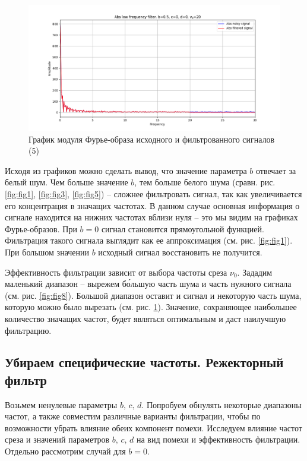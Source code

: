 \documentclass[a4paper, 12pt]{article}
\begin{document}
    \begin{figure}[H]
        \centering
        \includegraphics[scale=0.48]{5_abs_nohigh.png}
        \captionsetup{skip=0pt}
        \caption{График модуля Фурье-образа исходного и фильтрованного сигналов (5)}
        \label{fig:fig10}
    \end{figure}


    Исходя из графиков можно сделать вывод, что значение параметра $b$ отвечает за белый шум.
    Чем больше значение $b$, тем больше белого шума (сравн. рис. \ref{fig:fig1}, \ref{fig:fig3}, \ref{fig:fig5}) --
    сложнее фильтровать сигнал, так как увеличивается его концентрация в значащих частотах. В данном случае
    основная информация о сигнале находится на нижних частотах вблизи нуля -- это мы видим на графиках Фурье-образов.
    При $b=0$ сигнал становится прямоугольной функцией. Фильтрация такого сигнала выглядит как ее аппроксимация (см. рис. \ref{fig:fig1}).
    При большом значении $b$ исходный сигнал восстановить не получится.


    Эффективность фильтрации зависит от выбора частоты среза $\nu_0$. Зададим маленький диапазон --
    вырежем б\'{о}льшую часть шума и часть нужного сигнала (см. рис. \ref{fig:fig8}). Большой диапазон оставит и сигнал и некоторую
    часть шума, которую можно было вырезать (см. рис. \ref{fig:fig10}). Значение, сохраняющее наибольшее количество
    значащих частот, будет являться оптимальным и даст наилучшую фильтрацию.


    \subsection{Убираем специфические частоты. Режекторный фильтр}
    Возьмем ненулевые параметры $b,\,c,\,d$. Попробуем
    обнулять некоторые диапазоны частот, а также
    совместим различные варианты фильтрации, чтобы по возможности убрать влияние обеих компонент помехи.
    Исследуем влияние частот среза и значений параметров $b,\,c,\,d$ на вид помехи и эффективность
    фильтрации. Отдельно рассмотрим случай для $b=0$.
\end{document}
